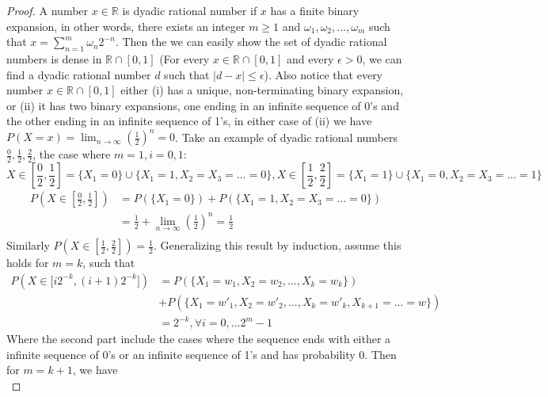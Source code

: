 \documentclass[10pt]{article}
\newenvironment{problem}[2][Problem]{\begin{trivlist}
\item[\hskip \labelsep {\bfseries #1}\hskip \labelsep {\bfseries #2.}]}{\end{trivlist}}
\begin{document}
 
\begin{problem}{4(b)}
\end{problem}
\begin{proof}
A number $x\in \mathbb{R}$ is dyadic rational number if $x$ has a finite binary expansion, in other words, there exists an integer $m \ge 1$ and $\omega_{1}, \omega_{2}, ..., \omega_{m}$ such that $x = \sum_{n=1}^{m}\omega_{n}2^{-n}$. Then the we can easily show the set of dyadic rational numbers is dense in $\mathbb{R} \cap [0,1]$ (For every $x \in \mathbb{R}\cap[0,1]$ and every $\epsilon > 0$, we can find a dyadic rational number $d$ such that $|d-x| \le \epsilon $). Also notice that every number $x \in \mathbb{R}\cap [0,1]$ either (i) has a unique, non-terminating binary expansion, or (ii) it has two binary expansions, one ending in an infinite sequence of 0’s and the other ending in an infinite sequence of 1’s, in either case of (ii) we have $P(X = x) = \lim_{n\rightarrow \infty}(\frac{1}{2})^n = 0$.
Take an example of dyadic rational numbers $\frac{0}{2}, \frac{1}{2}, \frac{2}{2}$, the case where $m = 1, i = 0,1$:
$$X \in [\frac{0}{2}, \frac{1}{2}] = \{X_{1}=0\}\cup\{X_{1}= 1, X_{2}=X_{3}=...=0\}, X \in [\frac{1}{2}, \frac{2}{2}] = \{X_{1}=1\}\cup\{X_{1}= 0, X_{2}=X_{3}=...=1\}$$
\begin{equation}
\begin{split}
P(X \in [\frac{0}{2}, \frac{1}{2}]) &= P(\{X_{1}=0\}) + P(\{X_{1}= 1, X_{2}=X_{3}=...=0\})\\
&= \frac{1}{2}+\lim_{n\rightarrow \infty}(\frac{1}{2})^n = \frac{1}{2}\\
\end{split}
\end{equation}
Similarly $P(X \in [\frac{1}{2}, \frac{2}{2}]) = \frac{1}{2}$. Generalizing this result by induction, assume this holds for $m=k$, such that 
\begin{equation}
\begin{split}
P(X \in \big[i2^{-k}, (i+1)2^{-k}\big]) &= P(\{X_{1}= w_{1}, X_{2}= w_{2},...,X_{k}= w_{k}\}) \\
& + P(\{X_{1}= w'_{1}, X_{2}= w'_{2},...,X_{k} = w'_{k}, X_{k+1}= ... = w\}) \\
& = 2^{-k}, \forall i = 0,...2^{m}-1
\end{split}
\end{equation}
Where the second part include the cases where the sequence ends with either a infinite sequence of 0’s or an infinite sequence of 1’s and has probability 0.
Then for $m = k+1$, we have
\begin{equation}

\end{equation}
\end{proof}
\end{document}
